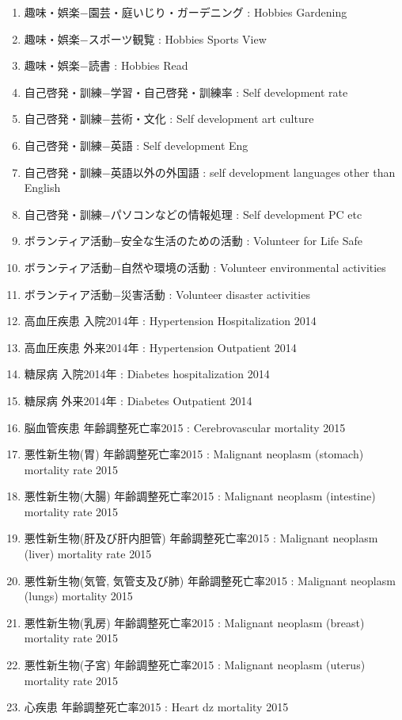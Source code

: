 \begin{multicols}{2}
\begin{enumerate}
  \item 趣味・娯楽−園芸・庭いじり・ガーデニング  :  Hobbies Gardening
  \item 趣味・娯楽−スポーツ観覧  :  Hobbies Sports View
  \item 趣味・娯楽−読書  :  Hobbies Read
  \item 自己啓発・訓練−学習・自己啓発・訓練率  :  Self development rate
  \item 自己啓発・訓練−芸術・文化  :  Self development art culture
  \item 自己啓発・訓練−英語  :  Self development Eng
  \item 自己啓発・訓練−英語以外の外国語  :  self development languages other than English
  \item 自己啓発・訓練−パソコンなどの情報処理  :  Self development PC etc
  \item ボランティア活動−安全な生活のための活動  :  Volunteer for Life Safe
  \item ボランティア活動−自然や環境の活動  :  Volunteer environmental activities
  \item ボランティア活動−災害活動  :  Volunteer disaster activities
  \item 高血圧疾患 入院2014年  :  Hypertension Hospitalization 2014
  \item 高血圧疾患 外来2014年  :  Hypertension Outpatient 2014
  \item 糖尿病 入院2014年  :  Diabetes hospitalization 2014
  \item 糖尿病 外来2014年  :  Diabetes Outpatient 2014
  \item 脳血管疾患 年齢調整死亡率2015  :  Cerebrovascular mortality 2015
  \item 悪性新生物(胃) 年齢調整死亡率2015  :  Malignant neoplasm (stomach) mortality rate 2015
  \item 悪性新生物(大腸) 年齢調整死亡率2015  :  Malignant neoplasm (intestine) mortality rate 2015
  \item 悪性新生物(肝及び肝内胆管) 年齢調整死亡率2015  :  Malignant neoplasm (liver) mortality rate 2015
  \item 悪性新生物(気管, 気管支及び肺) 年齢調整死亡率2015  :  Malignant neoplasm (lungs) mortality 2015
  \item 悪性新生物(乳房) 年齢調整死亡率2015  :  Malignant neoplasm (breast) mortality rate 2015
  \item 悪性新生物(子宮) 年齢調整死亡率2015  :  Malignant neoplasm (uterus) mortality rate 2015
  \item 心疾患 年齢調整死亡率2015  :  Heart dz mortality 2015

\end{enumerate}
\end{multicols}
